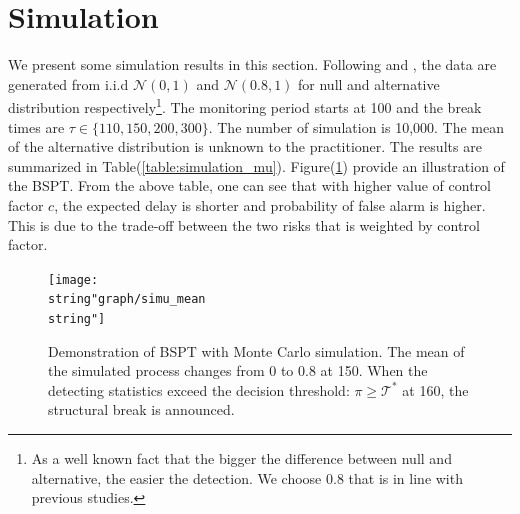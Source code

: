 \documentclass[preprint,authoryear,12pt,english]{elsarticle}
\theoremstyle{plain}
\begin{document}
\section{Simulation}
We present some simulation results in this section. Following \cite{Chu1996} and \cite{Zeileis2005}, the data are generated from i.i.d $\mathcal{N}(0,1)$ and $\mathcal{N}(0.8,1)$ for null and alternative distribution respectively\footnote{As a well known fact that the bigger the difference between null and alternative, the easier the detection. We choose $0.8$ that is in line with previous studies.}. The monitoring period starts at 100 and the break times are $\tau \in \{110,150, 200, 300\}$. The number of simulation is 10,000. The mean of the alternative distribution is unknown to the practitioner. The results are summarized in Table(\ref{table:simulation_mu}). Figure(\ref{fig:simulation_mean}) provide an illustration of the BSPT. From the above table, one can see that with higher value of control factor $c$, the expected delay is shorter and probability of false alarm is higher. This is due to the trade-off between the two risks that is weighted by control factor.
\noindent \begin{center}
    \begin{figure}[H]
        \centering
        \begin{minipage}[c]{1\textwidth}
            \centering
            \texttt{[image: \\string"graph/simu\_mean\\string"]}
            \caption{Demonstration of BSPT with Monte Carlo simulation. The mean of the simulated process changes from 0 to 0.8 at 150. When the detecting statistics exceed the decision threshold: $\pi \geq \mathcal{T}^{*}$ at 160, the structural break is announced.}
            \label{fig:simulation_mean}
        \end{minipage}
    \end{figure}
\end{center}
\end{document}
